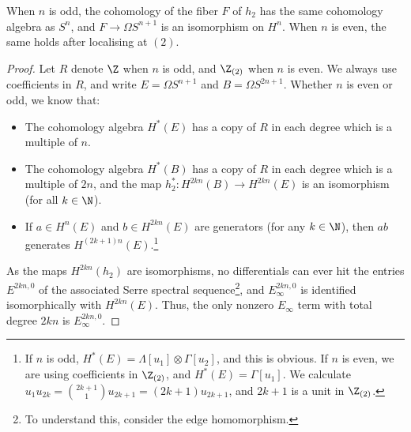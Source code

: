 \begin{claim}\label{SerreSSEHPfiberArg}
When $n$ is odd, the cohomology of the fiber $F$ of $h_2$ has the same cohomology algebra as $S^n$, and $F\to \Omega S^{n+1}$ is an isomorphism on $H^n$. When $n$ is even, the same holds after localising at $(2)$.
\end{claim}
\begin{proof}
Let $R$ denote $\Z$ when $n$ is odd, and $\Z_{(2)}$ when $n$ is even. We always use coefficients in $R$, and write $E=\Omega S^{n+1}$ and $B=\Omega S^{2n+1}$. Whether $n$ is even or odd, we know that:
\begin{itemize}
\item The cohomology algebra $H^*(E)$ has a copy of $R$ in each degree which is a multiple of $n$.
\item The cohomology algebra $H^*(B)$ has a copy of $R$ in each degree which is a multiple of $2n$, and the map $h_2^*:H^{2kn}(B)\to H^{2kn}(E)$ is an isomorphism (for all $k\in\N$).
\item If $a\in H^{n}(E)$ and $b\in H^{2kn}(E)$ are generators (for any $k\in\N$), then $ab$ generates $H^{(2k+1)n}(E)$.\footnote{If $n$ is odd, $H^*(E)=\Lambda[u_1]\otimes \Gamma[u_2]$, and this is obvious. If $n$ is even, we are using coefficients in $\Z_{(2)}$, and $H^*(E)=\Gamma[u_1]$. We calculate $u_1u_{2k}=\binom{2k+1}{1}u_{2k+1}=(2k+1)u_{2k+1}$, and $2k+1$ is a unit in $\Z_{(2)}$.}
\end{itemize}

As the maps $H^{2kn}(h_2)$ are isomorphisms, no differentials can ever hit the entries $E^{2kn,0}$ of the associated Serre spectral sequence\footnote{To understand this, consider the edge homomorphism.}, and $E^{2kn,0}_\infty$ is identified isomorphically with $H^{2kn}(E)$.
Thus, the only nonzero $E_\infty$ term with total degree $2kn$ is $E_\infty^{2kn,0}$.


\end{proof}
